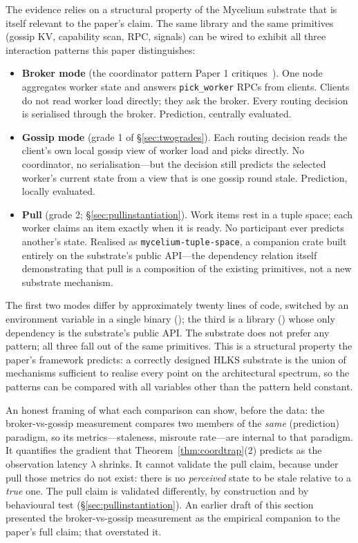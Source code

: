 \documentclass[11pt]{article}
\theoremstyle{definition}
\theoremstyle{plain}
\theoremstyle{plain}
\begin{document}
The evidence relies on a structural property of the Mycelium substrate
that is itself relevant to the paper's claim. The same library and the same
primitives (gossip KV, capability scan, RPC, signals) can be wired to
exhibit all three interaction patterns this paper distinguishes:

\begin{itemize}
\item \textbf{Broker mode} (the coordinator pattern Paper 1
  critiques~\cite{nicholson2026}). One node aggregates worker state and
  answers \texttt{pick\_worker} RPCs from clients. Clients do not read
  worker load directly; they ask the broker. Every routing decision is
  serialised through the broker. Prediction, centrally evaluated.
\item \textbf{Gossip mode} (grade 1 of \S\ref{sec:twogrades}). Each routing
  decision reads the client's own local gossip view of worker load and
  picks directly. No coordinator, no serialisation---but the decision still
  predicts the selected worker's current state from a view that is one
  gossip round stale. Prediction, locally evaluated.
\item \textbf{Pull} (grade 2; \S\ref{sec:pullinstantiation}). Work items
  rest in a tuple space; each worker claims an item exactly when it is
  ready. No participant ever predicts another's state. Realised as
  \texttt{mycelium-tuple-space}, a companion crate built entirely on the
  substrate's public API---the dependency relation itself demonstrating
  that pull is a composition of the existing primitives, not a new
  substrate mechanism.
\end{itemize}

The first two modes differ by approximately twenty lines of code, switched
by an environment variable in a single binary
(); the third is a library
() whose only dependency is the substrate's
public API. The substrate does not prefer any pattern; all three fall out
of the same primitives. This is a structural property the paper's framework
predicts: a correctly designed HLKS substrate is the union of mechanisms
sufficient to realise every point on the architectural spectrum, so the
patterns can be compared with all variables other than the pattern held
constant.

An honest framing of what each comparison can show, before the data: the
broker-vs-gossip measurement compares two members of the \emph{same}
(prediction) paradigm, so its metrics---staleness, misroute rate---are
internal to that paradigm. It quantifies the gradient that
Theorem~\ref{thm:coordtrap}(2) predicts as the observation latency
$\lambda$ shrinks. It cannot validate the pull claim, because under pull
those metrics do not exist: there is no \emph{perceived} state to be stale
relative to a \emph{true} one. The pull claim is validated differently, by
construction and by behavioural test (\S\ref{sec:pullinstantiation}). An
earlier draft of this section presented the broker-vs-gossip measurement as
the empirical companion to the paper's full claim; that overstated it.
\end{document}
